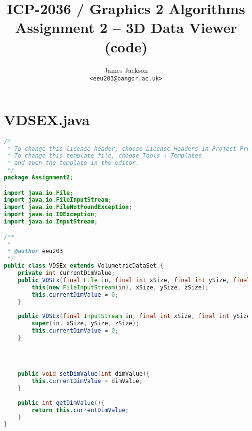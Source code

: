 \documentclass[pdftex,a4paper,10pt,titlepage]{article}
\begin{document}
\title{\textbf{ICP-2036 / Graphics 2 Algorithms} \\ Assignment 2 – 3D Data Viewer (code)}
\author{
James Jackson \\ \texttt{<eeu203@bangor.ac.uk>}
}
\maketitle




\pagebreak




\pagestyle{fancy}
\fancyhf{}
\cfoot{\thepage}

\tableofcontents

\pagebreak

\section{VDSEX.java}

\begin{lstlisting}[language=java, breaklines=true]
/*
 * To change this license header, choose License Headers in Project Properties.
 * To change this template file, choose Tools | Templates
 * and open the template in the editor.
 */
package Assignment2;

import java.io.File;
import java.io.FileInputStream;
import java.io.FileNotFoundException;
import java.io.IOException;
import java.io.InputStream;

/**
 *
 * @author eeu203
 */
public class VDSEx extends VolumetricDataSet {
    private int currentDimValue;
    public VDSEx(final File in, final int xSize, final int ySize, final int zSize) throws IOException, FileNotFoundException{
        this(new FileInputStream(in), xSize, ySize, zSize);
        this.currentDimValue = 0;
    }
    
    public VDSEx(final InputStream in, final int xSize, final int ySize, final int zSize) throws IOException, FileNotFoundException{
        super(in, xSize, ySize, zSize);
        this.currentDimValue = 0;
    }
    
    
    
    
    public void setDimValue(int dimValue){
        this.currentDimValue = dimValue;
    }
    
    public int getDimValue(){
        return this.currentDimValue;
    }
}

\end{lstlisting}
\end{document}
